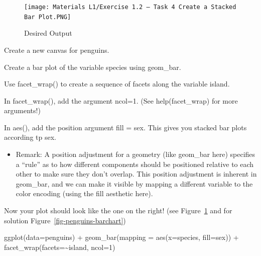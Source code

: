 \documentclass[
  letterpaper,
  DIV=11,
  numbers=noendperiod]{scrartcl}
\newenvironment{Shaded}{\begin{snugshade}}{\end{snugshade}}
\newcommand{\AttributeTok}[1]{\textcolor[rgb]{0.40,0.45,0.13}{#1}}
\newcommand{\DecValTok}[1]{\textcolor[rgb]{0.68,0.00,0.00}{#1}}
\newcommand{\FunctionTok}[1]{\textcolor[rgb]{0.28,0.35,0.67}{#1}}
\newcommand{\NormalTok}[1]{\textcolor[rgb]{0.00,0.23,0.31}{#1}}
\newcommand{\SpecialCharTok}[1]{\textcolor[rgb]{0.37,0.37,0.37}{#1}}
\providecommand{\tightlist}{%
  \setlength{\itemsep}{0pt}\setlength{\parskip}{0pt}}\usepackage{longtable,booktabs,array}
\begin{document}
\begin{figure}

{\centering \texttt{[image: Materials L1/Exercise 1.2 – Task 4 Create a Stacked Bar Plot.PNG]}

}

\caption{\label{fig-desired-output-canvas}Desired Output}

\end{figure}

Create a new canvas for penguins.

Create a bar plot of the variable species using geom\_bar.

Use facet\_wrap() to create a sequence of facets along the variable
island.

In facet\_wrap(), add the argument ncol=1. (See help(facet\_wrap) for
more arguments!)

In aes(), add the position argument fill = sex. This gives you stacked
bar plots according tp sex.

\begin{itemize}
\tightlist
\item
  Remark: A position adjustment for a geometry (like geom\_bar here)
  specifies a ``rule'' as to how different components should be
  positioned relative to each other to make sure they don't overlap.
  This position adjustment is inherent in geom\_bar, and we can make it
  visible by mapping a different variable to the color encoding (using
  the fill aesthetic here).
\end{itemize}

Now your plot should look like the one on the right! (see
Figure~\ref{fig-desired-output-canvas} and for solution
Figure~\ref{fig-penguins-barchart})

\begin{Shaded}
\begin{Highlighting}[]
\FunctionTok{ggplot}\NormalTok{(}\AttributeTok{data=}\NormalTok{penguins) }\SpecialCharTok{+} 
  \FunctionTok{geom\_bar}\NormalTok{(}\AttributeTok{mapping =} \FunctionTok{aes}\NormalTok{(}\AttributeTok{x=}\NormalTok{species, }\AttributeTok{fill=}\NormalTok{sex)) }\SpecialCharTok{+}
  \FunctionTok{facet\_wrap}\NormalTok{(}\AttributeTok{facets=}\SpecialCharTok{\textasciitilde{}}\NormalTok{island,}
             \AttributeTok{ncol=}\DecValTok{1}\NormalTok{)}
\end{Highlighting}
\end{Shaded}
\end{document}
